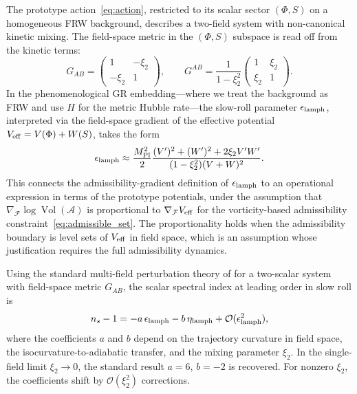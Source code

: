 \documentclass[12pt, a4paper]{article}
\newcommand{\calA}{\mathcal{A}}
\newcommand{\calF}{\mathcal{F}}
\newcommand{\etalamph}{\eta_{\rm lamph}}
\newcommand{\epslamph}{\epsilon_{\rm lamph}}
\newcommand{\Vol}{\operatorname{Vol}}
\begin{document}
The prototype action~\eqref{eq:action}, restricted to its scalar sector
$(\Phi, S)$ on a homogeneous FRW background, describes a two-field system with
non-canonical kinetic mixing. The field-space metric in the $(\Phi, S)$ subspace
is read off from the kinetic terms:
\begin{equation}
G_{AB} = \begin{pmatrix} 1 & -\xi_2 \\ -\xi_2 & 1 \end{pmatrix},
\qquad
G^{AB} = \frac{1}{1-\xi_2^2}\begin{pmatrix} 1 & \xi_2 \\ \xi_2 & 1 \end{pmatrix}.
\end{equation}
In the phenomenological GR embedding---where we treat the background as FRW and use
$H$ for the metric Hubble rate---the slow-roll parameter $\epsilon_{\rm lamph}$,
interpreted via the field-space gradient of the effective potential $V_{\rm eff} =
V(\Phi) + W(S)$, takes the form
\begin{equation}
\epsilon_{\rm lamph} \approx \frac{M_{\rm Pl}^2}{2}
\frac{(V')^2 + (W')^2 + 2\xi_2 V'W'}{(1-\xi_2^2)(V+W)^2}.
\label{eq:eps_operational}
\end{equation}
This connects the admissibility-gradient definition of $\epslamph$ to an operational
expression in terms of the prototype potentials, under the assumption that
$\nabla_{\calF}\log\Vol(\calA)$ is proportional to $\nabla_{\calF}V_{\rm eff}$ for
the vorticity-based admissibility constraint~\eqref{eq:admissible_set}. The
proportionality holds when the admissibility boundary is level sets of $V_{\rm eff}$
in field space, which is an assumption whose justification requires the full
admissibility dynamics.

Using the standard multi-field perturbation theory of \citet{Gordon2001} for a
two-scalar system with field-space metric $G_{AB}$, the scalar spectral index at
leading order in slow roll is
\begin{equation}
n_s - 1 = -a\,\epslamph - b\,\etalamph + \mathcal{O}(\epslamph^2),
\label{eq:ns_conjecture}
\end{equation}
where the coefficients $a$ and $b$ depend on the trajectory curvature in field
space, the isocurvature-to-adiabatic transfer, and the mixing parameter $\xi_2$.
In the single-field limit $\xi_2 \to 0$, the standard result $a = 6$, $b = -2$
is recovered. For nonzero $\xi_2$, the coefficients shift by $\mathcal{O}(\xi_2^2)$
corrections.
\end{document}
